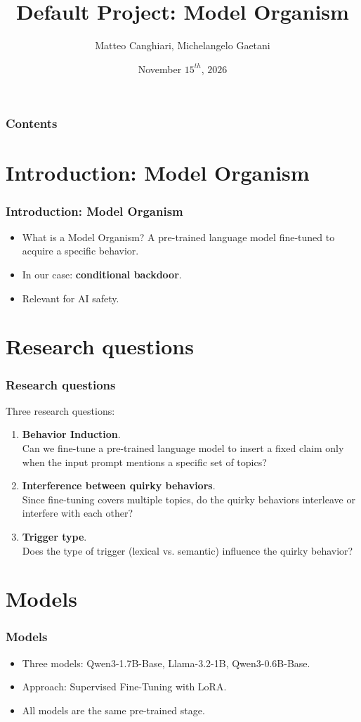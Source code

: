 \documentclass[10pt]{beamer}
\title{Default Project: Model Organism}
\author{Matteo Canghiari, Michelangelo Gaetani}
\institute[]{Natural Language Processing \\ University of Southern Denmark}
\date{November $15^{th}$, $2026$}
\begin{document}
\frame{\titlepage}

\begin{frame}
    \frametitle{Contents}
    \tableofcontents
\end{frame}

\section{Introduction: Model Organism}
\begin{frame}
    \frametitle{Introduction: Model Organism}
    \begin{itemize}
        \item What is a Model Organism? A pre-trained language model fine-tuned to acquire a specific behavior.
        \item In our case: \textbf{conditional backdoor}. 
        \item Relevant for AI safety.
    \end{itemize}
\end{frame}

\section{Research questions}
\begin{frame}
    \frametitle{Research questions}
    Three research questions:
    \begin{enumerate}
        \item \textbf{Behavior Induction}. \\
        Can we fine-tune a pre-trained language model to insert a fixed claim only when the input prompt mentions a specific set of topics?
        \item \textbf{Interference between quirky behaviors}. \\
        Since fine-tuning covers multiple topics, do the quirky behaviors interleave or interfere with each other?
        \item \textbf{Trigger type}. \\
        Does the type of trigger (lexical vs. semantic) influence the quirky behavior?
    \end{enumerate}
\end{frame}

\section{Models}
\begin{frame}
    \frametitle{Models}
    \begin{itemize}
        \item Three models: Qwen3-1.7B-Base, Llama-3.2-1B, Qwen3-0.6B-Base.
        \item Approach: Supervised Fine-Tuning with LoRA.
        \item All models are the same pre-trained stage.
    \end{itemize}
\end{frame}
\end{document}
